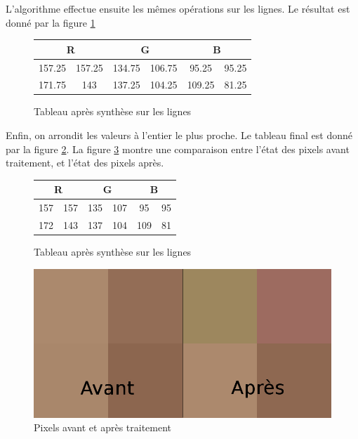 \documentclass{article}
\begin{document}
L'algorithme effectue ensuite les mêmes opérations sur les lignes. Le résultat est donné par la figure  \ref{tab6}

\begin{figure}[!h]
\begin{center}
\begin{tabular}{|c|c|c|c|c|c|}
\hline
\multicolumn{2}{|c|}{R} & \multicolumn{2}{|c|}{G}  & \multicolumn{2}{|c|}{B} \\
\hline
157.25    & 157.25   &   134.75  & 106.75 &   95.25  & 95.25   \\ 
\hline
171.75    & 143   &   137.25  & 104.25 &   109.25  & 81.25 \\
\hline
\end{tabular}
\end{center}
\caption{Tableau après synthèse sur les lignes}
\label{tab6}
\end{figure}

Enfin, on arrondit les valeurs à l'entier le plus proche. Le tableau final est donné par la figure \ref{tab7}. La figure \ref{after} montre une comparaison entre l'état des pixels avant traitement, et l'état des pixels après.

\begin{figure}[!h]
\begin{center}
\begin{tabular}{|c|c|c|c|c|c|}
\hline
\multicolumn{2}{|c|}{R} & \multicolumn{2}{|c|}{G}  & \multicolumn{2}{|c|}{B} \\
\hline
157    & 157  &   135  & 107 &   95  & 95   \\ 
\hline
172   & 143   &   137  & 104 &   109  & 81 \\
\hline
\end{tabular}
\end{center}
\caption{Tableau après synthèse sur les lignes}
\label{tab7}
\end{figure}

\begin{figure}[!h]
\centering
\includegraphics[scale=0.3]{aprescompress.jpg}
\caption{Pixels avant et après traitement}
\label{after}
\end{figure}
\end{document}
